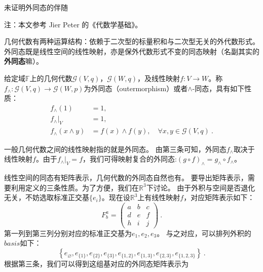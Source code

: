 
\begin{issues}
\issueDraft 未证明外同态的伴随
\end{issues}


注：本文参考 Jier Peter 的《代数学基础》。

几何代数有两种运算结构：依赖于二次型的标量积和与二次型无关的外代数形式。外同态既是线性空间的线性映射，亦是保外代数形式不变的同态映射（名副其实的\textbf{外同态}嘛）。
\begin{definition}{}
给定域$\mathbb F$上的几何代数$\mathcal G(V,q)$，$\mathcal G(W,q)$，及线性映射$f:V\rightarrow W$。称$f_{\wedge}:\mathcal G(V,q)\rightarrow \mathcal G(W,p)$为外同态（outermorphism）或者$\wedge$-同态，具有如下性质：
\begin{equation}
\begin{aligned}
f_\wedge(1)&=1,\\
f_\wedge|_V&=1,\\
f_\wedge(x\wedge y)&=f(x)\wedge f(y),\quad\forall x,y\in\mathcal G(V,q)~.
\end{aligned}
\end{equation}
\end{definition}
一般几何代数之间的线性映射指的就是外同态。
由第三条可知，外同态$f_{\wedge}$取决于线性映射$f$。由于$f_{\wedge}|_V=f$，我们可得映射复合的外同态:$(g\circ f)_{\wedge}=g_{\wedge} \circ f_\wedge$。

线性空间的同态有矩阵表示，几何代数的外同态自然也有。
要导出矩阵表示，需要利用定义的三条性质。为了方便，我们在$\mathbb R^3$下讨论。
由于外积与空间是否退化无关，不妨选取标准正交基$\{e_i\}$。现在设$\mathbb R^3$上有线性映射$f$，对应矩阵表示如下：
\begin{equation}
F_b^a=\left(\begin{array}{lll}
a & b & c \\
d & e & f \\
h & i & j
\end{array}\right)~.
\end{equation}
第一列到第三列分别对应的标准正交基为$e_1,e_2,e_3$。
与之对应，可以排列外积的$basis$如下：
$$
\left\{e_{\varnothing}, e_{\{1\}}, e_{\{2\}}, e_{\{3\}}, e_{\{1,2\}}, e_{\{1,3\}}, e_{\{2,3\}}, e_{\{1,2,3\}}\right\}~.
$$
根据第三条，我们可以得到这组基对应的外同态矩阵表示为

